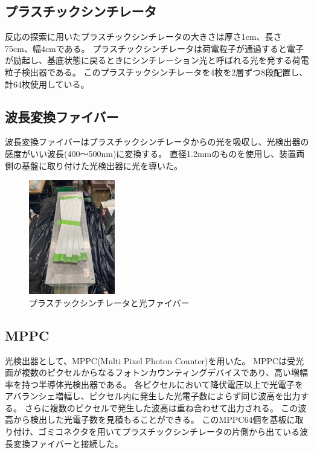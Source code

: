 \subsection{プラスチックシンチレータ}
反応の探索に用いたプラスチックシンチレータの大きさは厚さ1cm、長さ75cm、幅4cmである。
プラスチックシンチレータは荷電粒子が通過すると電子が励起し、基底状態に戻るときにシンチレーション光と呼ばれる光を発する荷電粒子検出器である。
このプラスチックシンチレータを4枚を2層ずつ8段配置し、計64枚使用している。

\subsection{波長変換ファイバー}
波長変換ファイバーはプラスチックシンチレータからの光を吸収し、光検出器の感度がいい波長(400～500nm)に変換する。
直径1.2mmのものを使用し、装置両側の基盤に取り付けた光検出器に光を導いた。

\begin{figure}[H]
    \centering
    \includegraphics[height=5cm]{img/Scinti.jpeg}
    \caption{プラスチックシンチレータと光ファイバー}
\end{figure}

\subsection{MPPC}
光検出器として、MPPC(Multi Pixel Photon Counter)を用いた。
MPPCは受光面が複数のピクセルからなるフォトンカウンティングデバイスであり、高い増幅率を持つ半導体光検出器である。
各ピクセルにおいて降伏電圧以上で光電子をアバランシェ増幅し、ピクセル内に発生した光電子数によらず同じ波高を出力する。
さらに複数のピクセルで発生した波高は重ね合わせて出力される。
この波高から検出した光電子数を見積もることができる。
このMPPC64個を基板に取り付け、ゴミコネクタを用いてプラスチックシンチレータの片側から出ている波長変換ファイバーと接続した。


